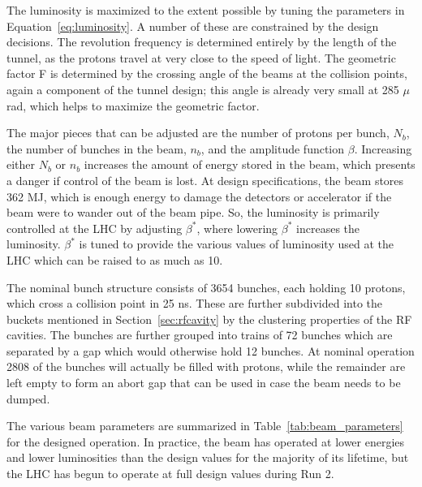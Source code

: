The luminosity is maximized to the extent possible by tuning the parameters in Equation~\ref{eq:luminosity}.
A number of these are constrained by the design decisions.
The revolution frequency is determined entirely by the length of the tunnel, as the protons travel at very close to the speed of light.
The geometric factor F is determined by the crossing angle of the beams at the collision points, again a component of the tunnel design; this angle is already very small at 285 $\mu$rad, which helps to maximize the geometric factor.

The major pieces that can be adjusted are the number of protons per bunch, $N_b$, the number of bunches in the beam, $n_b$, and the amplitude function $\beta$.
Increasing either $N_b$ or $n_b$ increases the amount of energy stored in the beam, which presents a danger if control of the beam is lost.
At design specifications, the beam stores 362 MJ, which is enough energy to damage the detectors or accelerator if the beam were to wander out of the beam pipe.
So, the luminosity is primarily controlled at the \ac{LHC} by adjusting $\beta^*$, where lowering $\beta^*$ increases the luminosity.
$\beta^*$ is tuned to provide the various values of luminosity used at the \ac{LHC} which can be raised to as much as 10.

The nominal bunch structure consists of 3654 bunches, each holding 10 protons, which cross a collision point in 25 ns. 
These are further subdivided into the buckets mentioned in Section~\ref{sec:rfcavity} by the clustering properties of the \ac{RF} cavities.
The bunches are further grouped into trains of 72 bunches which are separated by a gap which would otherwise hold 12 bunches.
At nominal operation 2808 of the bunches will actually be filled with protons, while the remainder are left empty to form an abort gap that can be used in case the beam needs to be dumped.

The various beam parameters are summarized in Table~\ref{tab:beam_parameters} for the designed operation.
In practice, the beam has operated at lower energies and lower luminosities than the design values for the majority of its lifetime, but the \ac{LHC} has begun to operate at full design values during Run 2.


